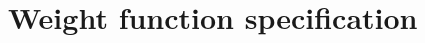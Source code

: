 \documentclass{snedecorbeamer}
\begin{document}

%   






\section{Weight function specification %
}
\end{document}
